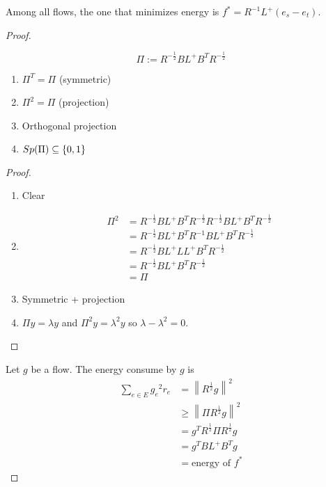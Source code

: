 \begin{theorem}
    Among all flows, the one that minimizes energy is $f^* = R^{-1}L^+(e_s-e_t)$.
\end{theorem}
\begin{proof}
	\begin{notation}
	    \[
	        \Pi := R^{-\frac{1}{2}} B L^+ B^T R^{-\frac{1}{2}}
	    \]
	\end{notation}
	
	\begin{proposition}
	    \begin{enumerate}
	        \item $\Pi^T = \Pi$ (symmetric)
	        \item $\Pi^2 = \Pi$ (projection)
	        \item Orthogonal projection
	        \item $Sp(\Pi) \subseteq \left\{ 0,1 \right\}$
	    \end{enumerate}
	\end{proposition}
	\begin{proof}
	    \begin{enumerate}
	        \item Clear
	        \item \[
	            \begin{aligned}
	                \Pi^2 &= R^{-\frac{1}{2}} B L^+ B^T R^{-\frac{1}{2}} R^{-\frac{1}{2}} B L^+ B^T R^{-\frac{1}{2}}\\
	                &= R^{-\frac{1}{2}} B L^+ B^T R^{-1} B L^+ B^T R^{-\frac{1}{2}}\\
	                &= R^{-\frac{1}{2}} B L^+ L L^+ B^T R^{-\frac{1}{2}}\\
	                &= R^{-\frac{1}{2}} B L^+ B^T R^{-\frac{1}{2}}\\
	                &= \Pi
	            \end{aligned}                    
	        \]
	        \item Symmetric + projection
	        \item $\Pi y=\lambda y$ and $\Pi^2 y = \lambda^2 y$ so $\lambda - \lambda^2 = 0$.
	    \end{enumerate}
	\end{proof}
    Let $g$ be a flow. The energy consume by $g$ is 
    \[
        \begin{aligned}
            \sum\limits_{e\in E} {g_e}^2 r_e &= \left\lVert R^{\frac{1}{2}} g \right\rVert^2\\
            &\geqslant \left\lVert  \Pi R^{\frac{1}{2}} g \right\rVert^2 \\
            &= g^T R^{\frac{1}{2}} \Pi R^{\frac{1}{2}}g\\
            &= g^TBL^+B^Tg\\
            &= \text{energy of }f^*
        \end{aligned}
    \]
\end{proof}	

